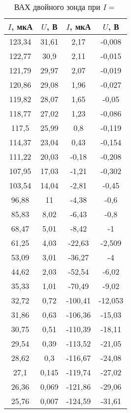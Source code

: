 \begin{table}[h!]
    \centering
    \begin{tabular}{|c|c|c|c|}
        \hline
        $I$, мкА & $U$, В & $I$, мкА & $U$, В    \\ \hline
        123,34   & 31,61  & 2,17     & -0,008    \\ \hline
        122,77   & 30,9   & 2,11     & -0,015    \\ \hline
        121,79   & 29,97  & 2,07     & -0,019    \\ \hline
        120,86   & 29,08  & 1,96     & -0,027    \\ \hline
        119,82   & 28,07  & 1,65     & -0,05     \\ \hline
        118,77   & 27,02  & 1,23     & -0,086    \\ \hline
        117,5    & 25,99  & 0,8      & -0,119    \\ \hline
        114,37   & 23,04  & 0,43     & -0,154    \\ \hline
        111,22   & 20,03  & -0,18    & -0,208    \\ \hline
        107,95   & 17,03  & -1,21    & -0,302    \\ \hline
        103,54   & 14,04  & -2,81    & -0,45     \\ \hline
        96,88    & 11     & -4,38    & -0,6      \\ \hline
        85,83    & 8,02   & -6,43    & -0,8      \\ \hline
        68,47    & 5,01   & -8,42    & -1        \\ \hline
        61,25    & 4,03   & -22,63   & -2,509    \\ \hline
        53,09    & 3,01   & -36,27   & -4        \\ \hline
        44,62    & 2,03   & -52,54   & -6,02     \\ \hline
        35,33    & 1,01   & -70,49   & -9,02     \\ \hline
        32,72    & 0,72   & -100,41  & -12,053   \\ \hline
        31,86    & 0,63   & -106,36  & -15,03    \\ \hline
        30,75    & 0,51   & -110,39  & -18,11    \\ \hline
        29,54    & 0,39   & -113,52  & -21,05    \\ \hline
        28,62    & 0,3    & -116,67  & -24,08    \\ \hline
        27,1     & 0,145  & -119,74  & -27,02    \\ \hline
        26,36    & 0,069  & -121,86  & -29,06    \\ \hline
        25,76    & 0,007  & -124,59  & -31,61    \\ \hline
    \end{tabular}
    \caption{ВАХ двойного зонда при $I = $}
    \label{VAC2}
\end{table}